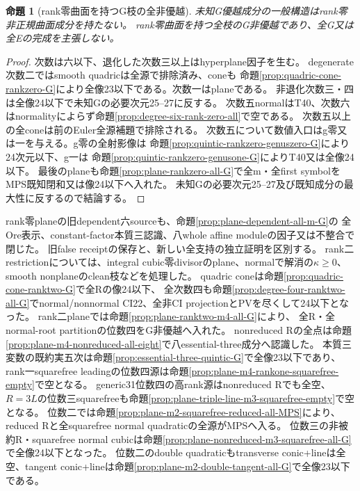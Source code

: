 \documentclass[a4paper,11pt]{ltjsarticle}
\newtheorem{proposition}{命題}[section]
\theoremstyle{definition}
\begin{document}
\begin{proposition}[rank零曲面を持つG枝の全非優越]\label{prop:G-rankzero-surface-frontier}
未知G優越成分の一般構造はrank零非正規曲面成分を持たない。
rank零曲面を持つ全枝のG非優越であり、全G又は全Eの完成を主張しない。
\end{proposition}
\begin{proof}
次数は六以下、退化した次数三以上はhyperplane因子を生む。
degenerate次数二ではsmooth quadricは全源で排除済み、coneも
命題\ref{prop:quadric-cone-rankzero-G}により全像23以下である。次数一はplaneである。
非退化次数三・四は全像24以下で未知Gの必要次元25--27に反する。
次数五normalはT40、次数六はnormalityによらず命題\ref{prop:degree-six-rank-zero-all}で空である。
次数五以上の全coneは前のEuler全源補題で排除される。
次数五について数値入口はg零又は一を与える。g零の全射影像は
命題\ref{prop:quintic-rankzero-genuszero-G}により24次元以下、g一は
命題\ref{prop:quintic-rankzero-genusone-G}によりT40又は全像24以下。
最後のplaneも命題\ref{prop:plane-rankzero-all-G}で全m・全first symbolをMPS既知閉和又は像24以下へ入れた。
未知Gの必要次元25--27及び既知成分の最大性に反するので結論する。
\end{proof}
rank零planeの旧dependent六sourceも、命題\ref{prop:plane-dependent-all-m-G}の
全Ore表示、constant-factor本質三認識、八whole affine moduleの因子又は不整合で閉じた。
旧false receiptの保存と、新しい全支持の独立証明を区別する。
rank二restrictionについては、integral cubic零divisorのplane、normalで解消の$\kappa\ge0$、
smooth nonplaneのclean枝などを処理した。
quadric coneは命題\ref{prop:quadric-cone-ranktwo-G}で全Rの像24以下、
全次数四も命題\ref{prop:degree-four-ranktwo-all-G}でnormal/nonnormal CI22、全非CI projectionとPVを尽くして24以下となった。
rank二planeでは命題\ref{prop:plane-ranktwo-m4-all-G}により、
全R・全normal-root partitionの位数四をG非優越へ入れた。
nonreduced Rの全点は命題\ref{prop:plane-m4-nonreduced-all-eight}で八essential-three成分へ認識した。
本質三変数の既約実五次は命題\ref{prop:essential-three-quintic-G}で全像23以下であり、
rank一squarefree leadingの位数四源は命題\ref{prop:plane-m4-rankone-squarefree-empty}で空となる。
generic31位数四の高rank源はnonreduced Rでも全空、
$R=3L$の位数三squarefreeも命題\ref{prop:plane-triple-line-m3-squarefree-empty}で空となる。
位数二では命題\ref{prop:plane-m2-squarefree-reduced-all-MPS}により、reduced Rと全squarefree normal quadraticの全源がMPSへ入る。
位数三の非被約R・squarefree normal cubicは命題\ref{prop:plane-nonreduced-m3-squarefree-all-G}で全像24以下となった。
位数二のdouble quadraticもtransverse conic+lineは全空、tangent conic+lineは命題\ref{prop:plane-m2-double-tangent-all-G}で全像23以下である。
\end{document}
